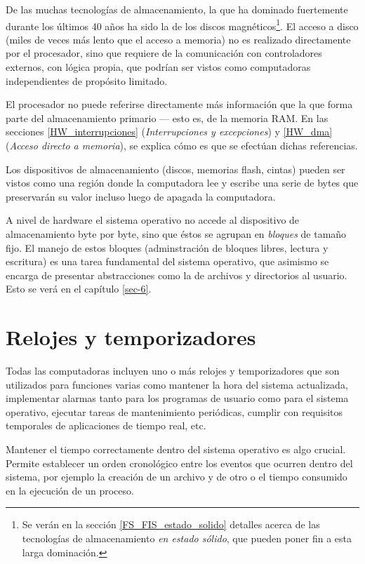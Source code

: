 \documentclass[11pt,fleqn]{book} %
\begin{document}
De las muchas tecnologías de almacenamiento, la que ha dominado
fuertemente durante los últimos 40 años ha sido la de los discos
magnéticos\footnote{Se verán en la sección \ref{FS_FIS_estado_solido} detalles
acerca de las tecnologías de almacenamiento \emph{en estado sólido}, que
pueden poner fin a esta larga dominación. }. El acceso a disco (miles
de veces más lento que el acceso a memoria) no es realizado
directamente por el procesador, sino que requiere de la comunicación
con controladores externos, con lógica propia, que podrían ser vistos
como computadoras independientes de propósito limitado.

El procesador no puede referirse directamente más información que la
que forma parte del almacenamiento primario — esto es, de la memoria
RAM. En las secciones \ref{HW_interrupciones}
(\emph{Interrupciones y excepciones}) y \ref{HW_dma} (\emph{Acceso directo a memoria}), se explica cómo es que se efectúan dichas referencias.

Los dispositivos de almacenamiento (discos, memorias flash, cintas)
pueden ser vistos como una región donde la computadora lee y escribe
una serie de bytes que preservarán su valor incluso luego de apagada
la computadora.

A nivel de hardware el sistema operativo no accede al dispositivo de
almacenamiento byte por byte, sino que éstos se agrupan en \emph{bloques}
de tamaño fijo.  El manejo de estos bloques (adminstración de bloques
libres, lectura y escritura) es una tarea fundamental del sistema
operativo, que asimismo se encarga de presentar abstracciones como la
de archivos y directorios al usuario. Esto se verá en el capítulo
\ref{sec-6}.
\section{Relojes y temporizadores}
\label{sec-2-5}

Todas las computadoras incluyen uno o más relojes y 
temporizadores que son utilizados para funciones varias como 
mantener la hora del sistema actualizada, implementar alarmas tanto para los
programas de usuario como para el sistema operativo, ejecutar
tareas de mantenimiento periódicas, cumplir con requisitos
temporales de aplicaciones de tiempo real, etc.

Mantener el tiempo correctamente dentro del sistema operativo
es algo crucial. Permite establecer un orden cronológico 
entre los eventos que ocurren dentro del sistema, por ejemplo
la creación de un archivo y de otro o el tiempo consumido
en la ejecución de un proceso. 
\end{document}
